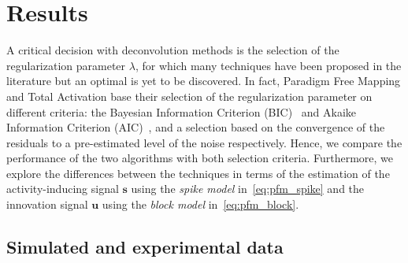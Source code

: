 \section{Results}


A critical decision with deconvolution methods is the selection of the regularization parameter \(\lambda\), for which many techniques have been proposed in the literature but an optimal is yet to be discovered. In fact, Paradigm Free Mapping and Total Activation base their selection of the regularization parameter on different criteria: the Bayesian Information Criterion (BIC)~\cite{schwarz1978EstimatingDimensionModel} and Akaike Information Criterion (AIC)~\cite{akaike1998InformationTheoryExtension}, and a selection based on the convergence of the residuals to a pre-estimated level of the noise respectively. Hence, we compare the performance of the two algorithms with both selection criteria. Furthermore, we explore the differences between the techniques in terms of the estimation of the activity-inducing signal \(\mathbf{s}\) using the \textit{spike model} in~\eqref{eq:pfm_spike} and the innovation signal \(\mathbf{u}\) using the \textit{block model} in~\eqref{eq:pfm_block}.

\subsection{Simulated and experimental data}
\label{sec:data}

